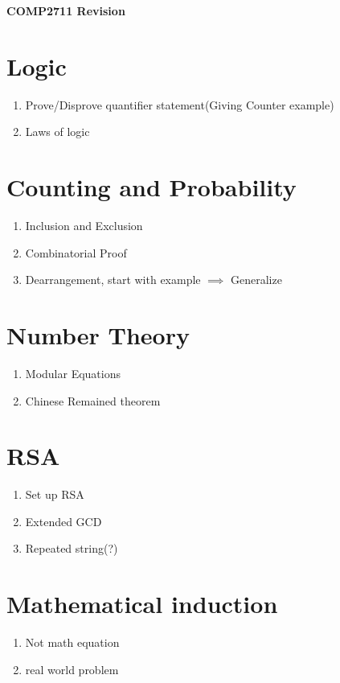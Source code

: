 \documentclass[11pt]{article}
\begin{document}
\begin{center}
\vspace{0.6cm}
{\Large \bf COMP2711 Revision}
\vspace{0.3cm}
\end{center}

\section{Logic}
\begin{enumerate}
    \item Prove/Disprove quantifier statement(Giving Counter example)
    \item Laws of logic
\end{enumerate}


\section{Counting and Probability}
\begin{enumerate}
    \item Inclusion and Exclusion
    \item Combinatorial Proof
    \item Dearrangement, start with example $\implies$ Generalize
\end{enumerate}


\section{Number Theory}
\begin{enumerate}
    \item Modular Equations
    \item Chinese Remained theorem
\end{enumerate}


\section{RSA}
\begin{enumerate}
    \item Set up RSA
    \item Extended GCD
    \item Repeated string(?)
\end{enumerate}


\section{Mathematical induction}
\begin{enumerate}
    \item Not math equation
    \item real world problem
\end{enumerate}
\end{document}
